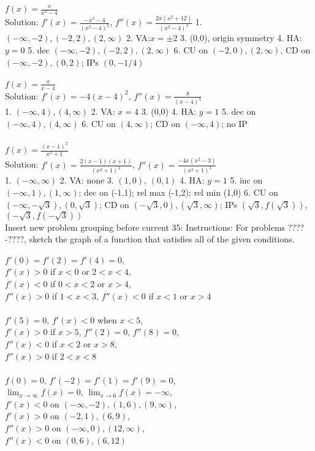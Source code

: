 \documentclass[10pt]{article}
\newcommand{\ds}{\displaystyle}
\begin{document}
$\ds f(x)=\frac{x}{x^2-4}$\\
Solution: $f'(x)=\frac{-x^2-4}{(x^2-4)^2}$, $f''(x)=\frac{2x(x^2+12)}{(x^2-4)^3}$
1. $(-\infty,-2),(-2,2),(2,\infty)$
2. VA:$x=\pm 2$
3. (0,0), origin symmetry
4. HA: $y=0$
5. dec  $(-\infty,-2),(-2,2),(2,\infty)$
6. CU on $(-2,0),(2,\infty)$, CD on $(-\infty,-2),(0, 2)$; IPs $(0,-1/4)$ \\ \\

$\ds f(x)=\frac{x}{x-4}$\\
Solution: $f'(x)={-4}{(x-4)^2}$, $f''(x)=\frac{8}{(x-4)^3}$\\
1. $(-\infty,4),(4,\infty)$
2. VA: $x=4$
3. (0,0)
4. HA: $y=1$
5. dec on $(-\infty,4),(4,\infty)$
6. CU on $(4,\infty)$; CD on $(-\infty,4)$; no IP\\ \\

$\ds f(x)=\frac{(x-1)^2}{x^2+1}$\\
Solution: $f'(x)=\frac{2(x-1)(x+1)}{(x^2+1)^2}$, $f''(x)=\frac{-4x(x^2-3)}{(x^2+1)^3}$\\
1. $(-\infty,\infty)$
2. VA: none
3. $(1,0)$, $(0,1)$
4. HA: $y=1$
5. inc on $(-\infty,1),(1,\infty)$; dec on (-1,1); rel max (-1,2); rel min (1,0)
6. CU on $(-\infty, -\sqrt3), (0,\sqrt 3)$; CD on $(-\sqrt3,0),(\sqrt3,\infty)$; IPs $(\sqrt 3,f(\sqrt3))$,  $(-\sqrt 3,f(-\sqrt3))$\\


Insert new problem grouping before current 35:
Instructions: For problems ????-????, sketch the graph of a function that satisfies all of the given conditions.

$f'(0)=f'(2)=f'(4)=0$,\\
$f'(x)>0$ if $x<0$ or $2<x<4$,\\
$f'(x)<0$ if $0<x<2$ or $x>4$,\\
$f''(x)>0$ if $1<x<3$, $f''(x)<0$ if $x<1$ or $x>4$\\ \\

$f'(5)=0$, $f'(x)<0$ when $x<5$,\\
$f'(x)>0$ if $x>5$, $f''(2)=0$, $f''(8)=0$,\\
$f''(x)<0$ if $x<2$ or $x>8$,\\
$f''(x)>0$ if $2<x<8$\\ \\

$f(0)=0$, $f'(-2)=f'(1)=f'(9)=0$,\\
$\ds \lim_{x\to\infty}f(x)=0$, $\ds \lim_{x\to 6}f(x)=-\infty$,\\
$f'(x)<0$ on $(-\infty,-2),(1,6),(9,\infty)$,\\
$f'(x)>0$ on $(-2,1),(6,9)$,\\
$f''(x)>0$ on $(-\infty,0),(12,\infty)$,\\
$f''(x)<0$ on $(0,6),(6,12)$\\ \\
\end{document}

